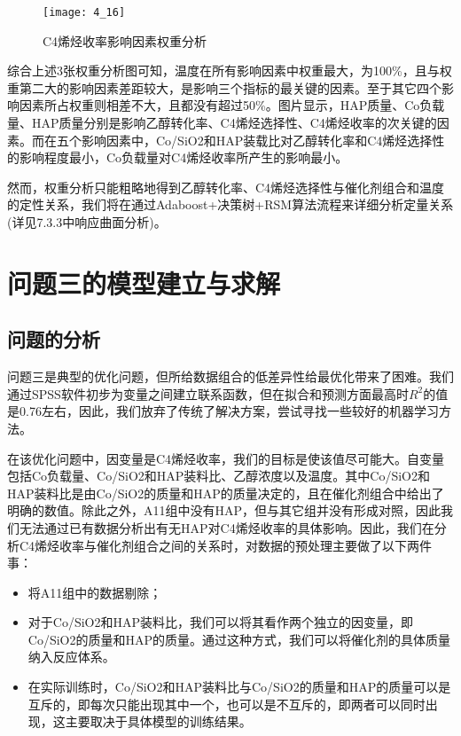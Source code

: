 \documentclass[withoutpreface,bwprint]{cumcmthesis} %
\begin{document}
\begin{figure}[!h]
	\centering
	\texttt{[image: 4\_16]}
	\caption{C4烯烃收率影响因素权重分析}
	\label{fig:circuit-diagram1}
\end{figure}
综合上述3张权重分析图可知，温度在所有影响因素中权重最大，为100\%，且与权重第二大的影响因素差距较大，是影响三个指标的最关键的因素。至于其它四个影响因素所占权重则相差不大，且都没有超过50\%。图片显示，HAP质量、Co负载量、HAP质量分别是影响乙醇转化率、C4烯烃选择性、C4烯烃收率的次关键的因素。而在五个影响因素中，Co/SiO2和HAP装载比对乙醇转化率和C4烯烃选择性的影响程度最小，Co负载量对C4烯烃收率所产生的影响最小。

然而，权重分析只能粗略地得到乙醇转化率、C4烯烃选择性与催化剂组合和温度的定性关系，我们将在通过Adaboost+决策树+RSM算法流程来详细分析定量关系(详见7.3.3中响应曲面分析)。

     

\newpage
\section{问题三的模型建立与求解}
\subsection{问题的分析}
问题三是典型的优化问题，但所给数据组合的低差异性给最优化带来了困难。我们通过SPSS软件初步为变量之间建立联系函数，但在拟合和预测方面最高时$R^2$的值是0.76左右，因此，我们放弃了传统了解决方案，尝试寻找一些较好的机器学习方法。

在该优化问题中，因变量是C4烯烃收率，我们的目标是使该值尽可能大。自变量包括Co负载量、Co/SiO2和HAP装料比、乙醇浓度以及温度。其中Co/SiO2和HAP装料比是由Co/SiO2的质量和HAP的质量决定的，且在催化剂组合中给出了明确的数值。除此之外，A11组中没有HAP，但与其它组并没有形成对照，因此我们无法通过已有数据分析出有无HAP对C4烯烃收率的具体影响。因此，我们在分析C4烯烃收率与催化剂组合之间的关系时，对数据的预处理主要做了以下两件事：
\begin{itemize}
	\item 将A11组中的数据剔除；
	\item 对于Co/SiO2和HAP装料比，我们可以将其看作两个独立的因变量，即Co/SiO2的质量和HAP的质量。通过这种方式，我们可以将催化剂的具体质量纳入反应体系。
	\item 在实际训练时，Co/SiO2和HAP装料比与Co/SiO2的质量和HAP的质量可以是互斥的，即每次只能出现其中一个，也可以是不互斥的，即两者可以同时出现，这主要取决于具体模型的训练结果。
\end{itemize}
\end{document}

